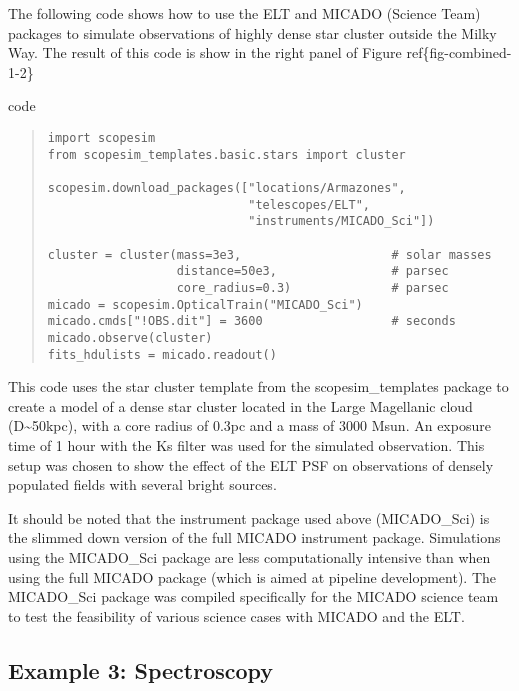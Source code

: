 The following code shows how to use the ELT and MICADO (Science Team) packages to simulate observations of highly dense star cluster outside the Milky Way.
The result of this code is show in the right panel of Figure ref\{fig-combined-1-2\}

\label{code-example-2-cluster}
\begin{DUclass}{code}
\begin{quote}
\begin{alltt}
\begin{lstlisting}[frame=single]
import scopesim
from scopesim_templates.basic.stars import cluster

scopesim.download_packages(["locations/Armazones",
                            "telescopes/ELT",
                            "instruments/MICADO_Sci"])

cluster = cluster(mass=3e3,                     # solar masses
                  distance=50e3,                # parsec
                  core_radius=0.3)              # parsec
micado = scopesim.OpticalTrain("MICADO_Sci")
micado.cmds["!OBS.dit"] = 3600                  # seconds
micado.observe(cluster)
fits_hdulists = micado.readout()
\end{lstlisting}
\end{alltt}
\end{quote}
\end{DUclass}

This code uses the star cluster template from the scopesim\_templates package to create a model of a dense star cluster located in the Large Magellanic cloud (D\textasciitilde{}50kpc), with a core radius of 0.3pc and a mass of 3000 Msun.
An exposure time of 1 hour with the Ks filter was used for the simulated observation.
This setup was chosen to show the effect of the ELT PSF on observations of densely populated fields with several bright sources.

It should be noted that the instrument package used above (MICADO\_Sci) is the slimmed down version of the full MICADO instrument package.
Simulations using the MICADO\_Sci package are less computationally intensive than when using the full MICADO package (which is aimed at pipeline development).
The MICADO\_Sci package was compiled specifically for the MICADO science team to test the feasibility of various science cases with MICADO and the ELT.


\subsection{Example 3: Spectroscopy%
  \label{example-3-spectroscopy}%
}

